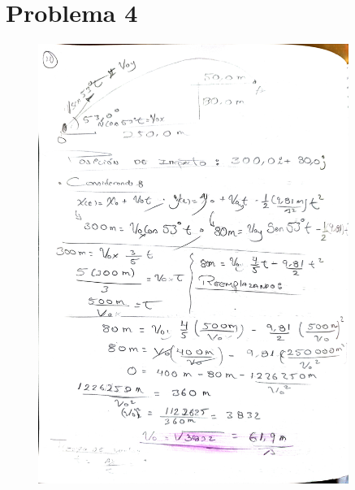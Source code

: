 \documentclass{article}
\begin{document}
\section{Problema 4}
\begin{figure}[H]
  \centering
  \includegraphics[width=0.9\textwidth]{assets/4.jpg}
  \label{fig:example_image4}
\end{figure}
\end{document}
